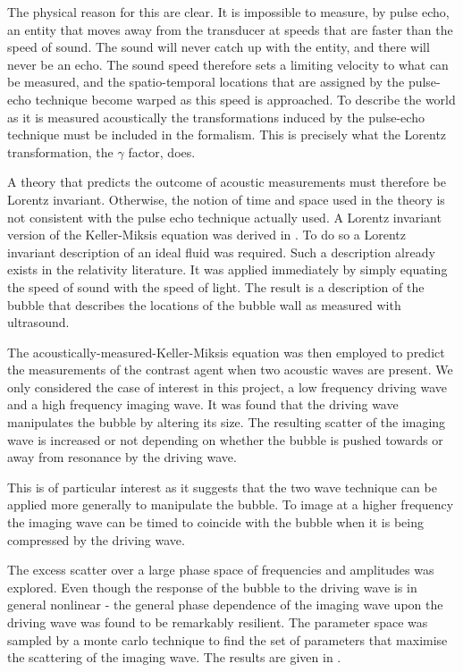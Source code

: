 The physical reason for this are clear.
It is impossible to measure, by pulse echo, an entity that moves away from the transducer at speeds that are faster than the speed of sound.
The sound will never catch up with the entity, and  there will never be an echo.
The sound speed therefore sets a limiting velocity to what can be measured,
and the spatio-temporal locations that are assigned by the pulse-echo technique become warped as this speed is approached.
To describe the world as it is measured acoustically the transformations induced by the pulse-echo technique must be included in the formalism.
This is precisely what the Lorentz transformation, the $\gamma$ factor, does.

A theory that predicts the outcome of acoustic measurements must therefore be Lorentz invariant.
Otherwise, the notion of time and space used in the theory is not consistent with the pulse echo technique actually used.
A Lorentz invariant version of the Keller-Miksis equation was derived in .
To do so a Lorentz invariant description of an ideal fluid was required.
Such a description already exists in the relativity literature.
It was applied  immediately by simply equating the speed of sound with the speed of light.
The result is a description of the bubble that describes the locations of the bubble wall as measured with ultrasound.

The acoustically-measured-Keller-Miksis equation was then employed to 
predict the measurements of the contrast agent when two acoustic waves are present.
We only considered the case of interest in this project, 
a low frequency driving wave and a high frequency imaging wave.
It was found that the driving wave manipulates the bubble by altering its size.
The resulting scatter of the imaging wave is increased or not depending on whether the bubble 
is pushed towards or away from resonance by the driving wave.

This is of particular interest as it suggests that the two wave technique can be applied more generally
to manipulate the bubble.
To image at a higher frequency the imaging wave can be timed to coincide with the bubble when it is being compressed by the driving wave.

The excess scatter over a large phase space of frequencies and amplitudes was explored.
Even though the response of the bubble to the driving wave 
is in general nonlinear - the general phase dependence of the imaging wave upon the driving wave was found to be remarkably resilient.
The parameter space was sampled by a monte carlo technique to find the set of parameters that maximise the scattering of the imaging wave.
The results are given in .


